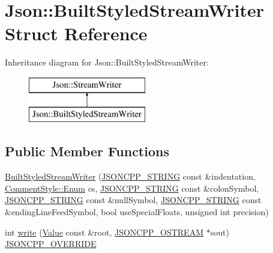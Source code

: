 \hypertarget{structJson_1_1BuiltStyledStreamWriter}{}\section{Json\+:\+:Built\+Styled\+Stream\+Writer Struct Reference}
\label{structJson_1_1BuiltStyledStreamWriter}
Inheritance diagram for Json\+:\+:Built\+Styled\+Stream\+Writer\+:\begin{figure}[H]
\begin{center}
\leavevmode
\includegraphics[height=2.000000cm]{structJson_1_1BuiltStyledStreamWriter}
\end{center}
\end{figure}
\subsection*{Public Member Functions}
\begin{DoxyCompactItemize}
\item 
\hyperlink{structJson_1_1BuiltStyledStreamWriter_adf11b7d1ee3c68d096b7c662ee85948e_adf11b7d1ee3c68d096b7c662ee85948e}{Built\+Styled\+Stream\+Writer} (\hyperlink{json_8h_a1e723f95759de062585bc4a8fd3fa4be_a1e723f95759de062585bc4a8fd3fa4be}{J\+S\+O\+N\+C\+P\+P\+\_\+\+S\+T\+R\+I\+NG} const \&indentation, \hyperlink{structJson_1_1CommentStyle_a51fc08f3518fd81eba12f340d19a3d0c_a51fc08f3518fd81eba12f340d19a3d0c}{Comment\+Style\+::\+Enum} cs, \hyperlink{json_8h_a1e723f95759de062585bc4a8fd3fa4be_a1e723f95759de062585bc4a8fd3fa4be}{J\+S\+O\+N\+C\+P\+P\+\_\+\+S\+T\+R\+I\+NG} const \&colon\+Symbol, \hyperlink{json_8h_a1e723f95759de062585bc4a8fd3fa4be_a1e723f95759de062585bc4a8fd3fa4be}{J\+S\+O\+N\+C\+P\+P\+\_\+\+S\+T\+R\+I\+NG} const \&null\+Symbol, \hyperlink{json_8h_a1e723f95759de062585bc4a8fd3fa4be_a1e723f95759de062585bc4a8fd3fa4be}{J\+S\+O\+N\+C\+P\+P\+\_\+\+S\+T\+R\+I\+NG} const \&ending\+Line\+Feed\+Symbol, bool use\+Special\+Floats, unsigned int precision)
\item 
int \hyperlink{structJson_1_1BuiltStyledStreamWriter_a823cdb1afabb6b0d5f39bcd5a6a6f747_a823cdb1afabb6b0d5f39bcd5a6a6f747}{write} (\hyperlink{classJson_1_1Value}{Value} const \&root, \hyperlink{json_8h_a37a25be5fca174927780caeb280094ce_a37a25be5fca174927780caeb280094ce}{J\+S\+O\+N\+C\+P\+P\+\_\+\+O\+S\+T\+R\+E\+AM} $\ast$sout) \hyperlink{json_8h_a824d6199c91488107e443226fa6022c5_a824d6199c91488107e443226fa6022c5}{J\+S\+O\+N\+C\+P\+P\+\_\+\+O\+V\+E\+R\+R\+I\+DE}
\end{DoxyCompactItemize}
